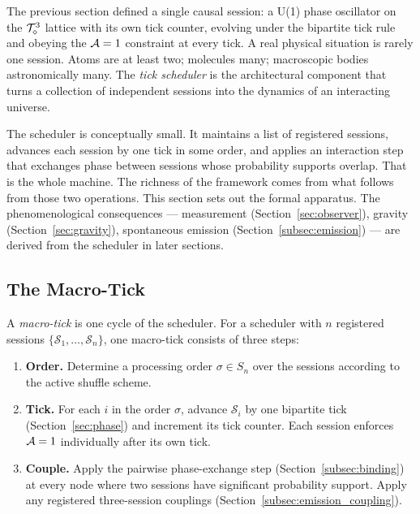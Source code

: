 
\label{sec:scheduler}

The previous section defined a single causal session: a U(1) phase
oscillator on the $\mathcal{T}_\diamond^3$ lattice with its own tick counter, evolving
under the bipartite tick rule and obeying the $\mathcal{A}=1$ constraint at every
tick.
A real physical situation is rarely one session.
Atoms are at least two; molecules many; macroscopic bodies astronomically
many.
The \emph{tick scheduler} is the architectural component that turns a
collection of independent sessions into the dynamics of an interacting
universe.

The scheduler is conceptually small.
It maintains a list of registered sessions, advances each session by one
tick in some order, and applies an interaction step that exchanges phase
between sessions whose probability supports overlap.
That is the whole machine.
The richness of the framework comes from what follows from those two
operations.
This section sets out the formal apparatus.
The phenomenological consequences --- measurement
(Section~\ref{sec:observer}), gravity
(Section~\ref{sec:gravity}), spontaneous emission
(Section~\ref{subsec:emission}) --- are derived from the scheduler in
later sections.

\subsection{The Macro-Tick}
\label{subsec:macro_tick}

A \emph{macro-tick} is one cycle of the scheduler.
For a scheduler with $n$ registered sessions
$\{\mathcal{S}_1, \ldots, \mathcal{S}_n\}$, one macro-tick consists of
three steps:

\begin{enumerate}
    \item \textbf{Order.}  Determine a processing order
    $\sigma \in S_n$ over the sessions according to the active shuffle
    scheme.
    \item \textbf{Tick.}  For each $i$ in the order $\sigma$, advance
    $\mathcal{S}_i$ by one bipartite tick (Section~\ref{sec:phase}) and
    increment its tick counter.  Each session enforces $\mathcal{A}=1$
    individually after its own tick.
    \item \textbf{Couple.}  Apply the pairwise phase-exchange step
    (Section~\ref{subsec:binding}) at every node where two sessions have
    significant probability support.  Apply any registered three-session
    couplings (Section~\ref{subsec:emission_coupling}).
\end{enumerate}

